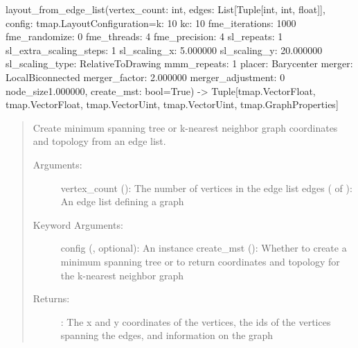 \documentclass[letterpaper,10pt,english]{sphinxmanual}
\begin{document}

\begin{fulllineitems}
\label{\detokenize{documentation:tmap.layout_from_edge_list}}
layout\_from\_edge\_list(vertex\_count: int, edges: List{[}Tuple{[}int, int, float{]}{]}, config: tmap.LayoutConfiguration=k: 10
kc: 10
fme\_iterations: 1000
fme\_randomize: 0
fme\_threads: 4
fme\_precision: 4
sl\_repeats: 1
sl\_extra\_scaling\_steps: 1
sl\_scaling\_x: 5.000000
sl\_scaling\_y: 20.000000
sl\_scaling\_type: RelativeToDrawing
mmm\_repeats: 1
placer: Barycenter
merger: LocalBiconnected
merger\_factor: 2.000000
merger\_adjustment: 0
node\_size1.000000, create\_mst: bool=True) -\textgreater{} Tuple{[}tmap.VectorFloat, tmap.VectorFloat, tmap.VectorUint, tmap.VectorUint, tmap.GraphProperties{]}
\begin{quote}

Create minimum spanning tree or k-nearest neighbor graph coordinates and topology from an edge list.
\begin{description}
\item[{Arguments:}] \leavevmode
vertex\_count (): The number of vertices in the edge list
edges ( of ): An edge list defining a graph

\item[{Keyword Arguments:}] \leavevmode
config ({\hyperref[\detokenize{documentation:tmap.LayoutConfiguration}]{}}, optional): An {\hyperref[\detokenize{documentation:tmap.LayoutConfiguration}]{}} instance
create\_mst (): Whether to create a minimum spanning tree or to return coordinates and topology for the k-nearest neighbor graph

\item[{Returns:}] \leavevmode
{}: The x and y coordinates of the vertices, the ids of the vertices spanning the edges, and information on the graph

\end{description}
\end{quote}

\end{fulllineitems}
\end{document}
